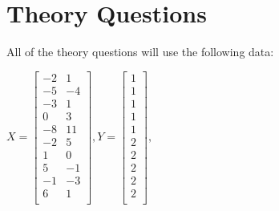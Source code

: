 \documentclass[12pt]{article}
\begin{document}
\maketitle

\section{Theory Questions}
All of the theory questions will use the following data:
\begin{center}
$X=
 \begin{bmatrix}
	-2 & 1\\
	-5 & -4\\	
	-3 & 1\\
	0 & 3\\
	-8 & 11\\
	-2 & 5\\
	1 & 0\\
	5 & -1\\
	-1 & -3\\
	6 & 1\\
\end{bmatrix},
Y =  \begin{bmatrix}
1\\
1\\
1\\
1\\
1\\
2\\
2\\
2\\
2\\
2\\
\end{bmatrix},
$
\end{center}
\end{document}
